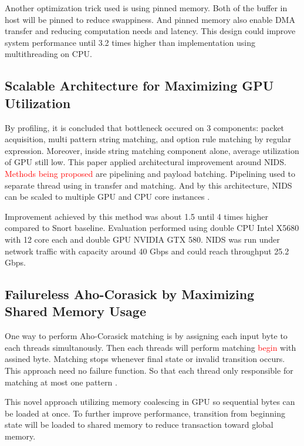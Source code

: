 \documentclass[conference]{IEEEtran}
\begin{document}
        Another optimization trick used is using pinned memory. Both of the buffer in host will be pinned to reduce swappiness. And pinned memory also enable DMA transfer and reducing computation needs and latency. This design could improve system performance until 3.2 times higher than implementation using multithreading on CPU.

    \subsection{Scalable Architecture for Maximizing GPU Utilization}

        By profiling, it is concluded that bottleneck occured on 3 components: packet acquisition, multi pattern string matching, and option rule matching by regular expression. Moreover, inside string matching component alone, average utilization of GPU still low. This paper applied architectural improvement around NIDS. \textcolor{red}{Methods being proposed} are pipelining and payload batching. Pipelining used to separate thread using in transfer and matching. And by this architecture, NIDS can be scaled to multiple GPU and CPU core instances \cite{kargus2012}. 
        
        Improvement achieved by this method was about 1.5 until 4 times higher compared to Snort baseline. Evaluation performed using double CPU Intel X5680 with 12 core each and double GPU NVIDIA GTX 580. NIDS was run under network traffic with capacity around 40 Gbps and could reach throughput 25.2 Gbps.

    \subsection{Failureless Aho-Corasick by Maximizing Shared Memory Usage}

        One way to perform Aho-Corasick matching is by assigning each input byte to each threads simultanously. Then each threads will perform matching \textcolor{red}{begin} with assined byte. Matching stops whenever final state or invalid transition occurs. This approach need no failure function. So that each thread only responsible for matching at most one pattern \cite{lin2013}.
        
        This novel approach utilizing memory coalescing in GPU so sequential bytes can be loaded at once. To further improve performance, transition from beginning state will be loaded to shared memory to reduce transaction toward global memory. 
        
\end{document}
